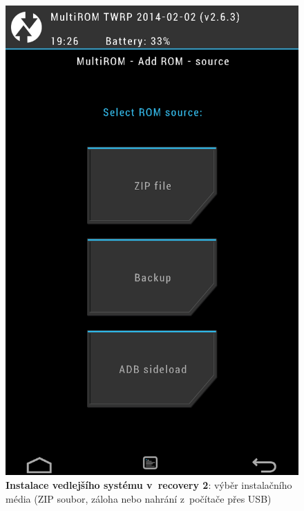 \documentclass[12pt, a4paper, oneside]{article}
\newcommand{\B}{\textbf} %
\begin{document}
\begin{figure}[H]
\begin{center}
 \includegraphics[height=\textheight-40]{img/recovery_install2.png}
\caption{\B{Instalace vedlejšího systému v~recovery 2}: výběr instalačního média (ZIP soubor, záloha nebo nahrání z~počítače přes USB)}
\end{center}
\end{figure}

\addtolength{\textheight}{-70pt}
\end{document}
